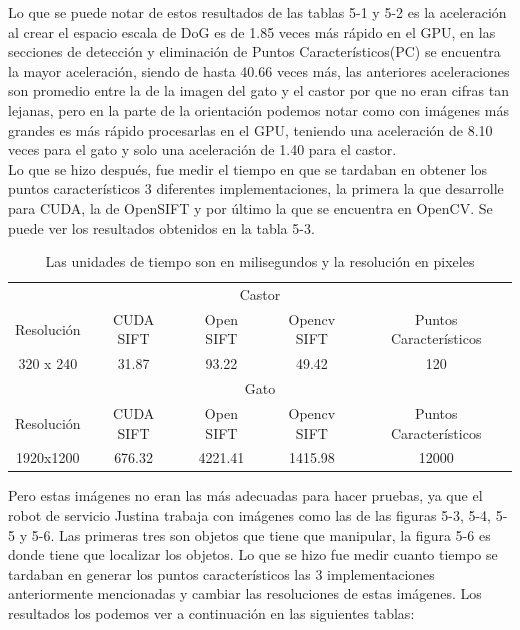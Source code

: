%


Lo que se puede notar de estos resultados de las tablas 5-1 y 5-2 es la aceleración al crear el espacio escala de DoG es de 1.85 veces más rápido en el GPU, en las secciones de detección y eliminación de Puntos Característicos(PC) se encuentra la mayor aceleración, siendo de hasta 40.66 veces más, las anteriores aceleraciones son promedio entre la de la imagen del gato y el castor por que no eran cifras tan lejanas, pero en la parte de la orientación podemos notar como con imágenes más grandes es más rápido procesarlas en el GPU, teniendo una aceleración de 8.10 veces para el gato y solo una aceleración de 1.40 para el castor.\\
Lo que se hizo después, fue medir el tiempo en que se tardaban en obtener los puntos característicos 3 diferentes implementaciones, la primera la que desarrolle para CUDA, la de OpenSIFT y por último la que se encuentra en OpenCV. Se puede ver los resultados obtenidos en la tabla 5-3. 

\begin{table}[htb]
\centering
\begin{tabular}{|c|c|c|c|c|}
\hline

\multicolumn{5}{|c|}{Castor} \\
\cline{1-5}
Resolución & CUDA SIFT & Open SIFT & Opencv SIFT & Puntos Característicos\\
\hline \hline
 320 x 240  & 31.87   &   93.22  &  49.42   & 120\\ \cline{1-5}
\hline \hline
\multicolumn{5}{|c|}{Gato} \\
\cline{1-5}
Resolución & CUDA SIFT & Open SIFT & Opencv SIFT & Puntos Característicos\\
\hline \hline
1920x1200  & 676.32 &  4221.41 & 1415.98   & 12000\\ \cline{1-5}


\end{tabular}
\caption{Las unidades de tiempo son en milisegundos y la resolución en pixeles}
\label{tabla:final}
\end{table}

\pagebreak


Pero estas imágenes no eran las más adecuadas para hacer pruebas, ya que el robot de servicio Justina trabaja con imágenes como las de las figuras 5-3, 5-4, 5-5 y 5-6. Las primeras tres son objetos que tiene que manipular, la figura 5-6 es donde tiene que localizar los objetos.
Lo que se hizo fue medir cuanto tiempo se tardaban en generar los puntos característicos las 3 implementaciones anteriormente mencionadas y cambiar las resoluciones de estas imágenes. Los resultados los podemos ver a continuación en las siguientes tablas:


